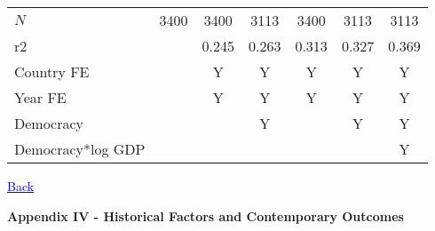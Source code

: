\documentclass[9pt,letterpaper,subeqn]{beamer}
\begin{document}
\begin{frame}[label=RightsComp]
\begin{table}[htbp]
{\begin{tabular}{l*{6}{c}}
\hline
\(N\)       &        3400         &        3400         &        3113         &        3400         &        3113         &        3113         \\
r2          &                     &       0.245         &       0.263         &       0.313         &       0.327         &       0.369         \\
\hline
Country FE        &                     &    Y                 &      Y               &     Y         &           Y          &     Y         \\
Year FE            &                     &    Y                 &      Y               &     Y         &           Y          &     Y         \\
Democracy       &                     &                     &     Y &                     &      Y  &      Y\\
Democracy*log GDP   &                     &                     &                     &                     &                     &      Y\\

\hline
\end{tabular}}
\end{table}
\hyperlink{Rights}{\textcolor{blue}{Back}}
\end{frame}

\begin{frame}[plain]
\begin{center}
\textbf{Appendix IV - Historical Factors and Contemporary Outcomes}
\end{center}
\end{frame}
\end{document}
